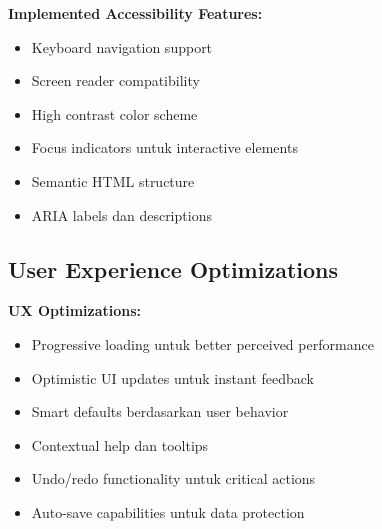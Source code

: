 \textbf{Implemented Accessibility Features:}
\begin{itemize}
\item Keyboard navigation support
\item Screen reader compatibility
\item High contrast color scheme
\item Focus indicators untuk interactive elements
\item Semantic HTML structure
\item ARIA labels dan descriptions
\end{itemize}

\subsection{User Experience Optimizations}

\textbf{UX Optimizations:}
\begin{itemize}
\item Progressive loading untuk better perceived performance
\item Optimistic UI updates untuk instant feedback
\item Smart defaults berdasarkan user behavior
\item Contextual help dan tooltips
\item Undo/redo functionality untuk critical actions
\item Auto-save capabilities untuk data protection
\end{itemize}